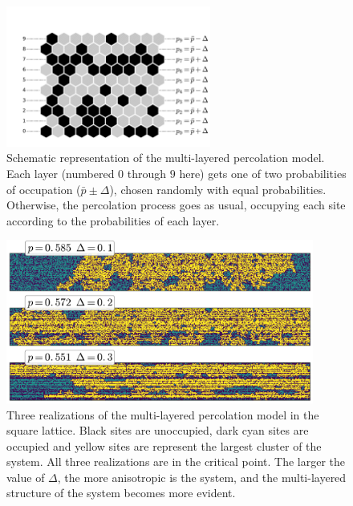 \begin{figure}[b]
\begin{center}
    \includegraphics[width=0.6\textwidth]{chapters/ch5-anis/figs/mlperco_explain}
\end{center}
\caption{Schematic representation of the multi-layered percolation model. Each
    layer (numbered $0$ through $9$ here) gets one of two probabilities of
    occupation ($\bar{p}\pm\Delta$), chosen randomly with equal probabilities.
    Otherwise, the percolation process goes as usual, occupying each site
    according to the probabilities of each layer.}
\label{fig:mlperco_explain}
\end{figure}

\begin{figure}[t]
\begin{center}
    \includegraphics[width=0.9\textwidth]{chapters/ch5-anis/figs/mlperco}
\end{center}
\caption{Three realizations of the multi-layered percolation model in the
    square lattice. Black sites are unoccupied, dark cyan sites are occupied
    and yellow sites are represent the largest cluster of the system. All
    three realizations are in the critical point. The larger the value of
    $\Delta$, the more anisotropic is the system, and the multi-layered
    structure of the system becomes more evident.}
\label{fig:mlperco}
\end{figure}

